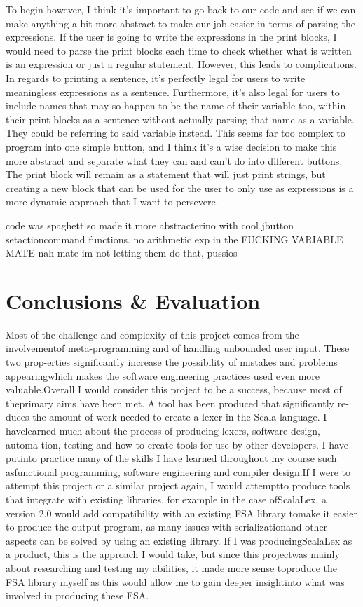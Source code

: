 \documentclass[a4paper, 12pt]{article}
\begin{document}
            To begin however, I think it's important to go back to our code and see if we can make anything
            a bit more abstract to make our job easier in terms of parsing the expressions. If the user is
            going to write the expressions in the print blocks, I would need to parse the print blocks each
            time to check whether what is written is an expression or just a regular statement. However,
            this leads to complications. In regards to printing a sentence, it's perfectly legal for
            users to write meaningless expressions as a sentence. Furthermore, it's also legal for users
            to include names that may so happen to be the name of their variable too, within their print
            blocks as a sentence without actually parsing that name as a variable. They could be referring
            to said variable instead. This seems far too complex to program into one simple button, and
            I think it's a wise decision to make this more abstract and separate what they can and can't do
            into different buttons. The print block will remain as a statement that will just print strings,
            but creating a new block that can be used for the user to only use as expressions is a more
            dynamic approach that I want to persevere.

            code was spaghett so made it more abstracterino with cool jbutton setactioncommand functions.
            no arithmetic exp in the FUCKING VARIABLE MATE nah mate im not letting them do that, pussios


    \clearpage
    \section{Conclusions \& Evaluation}
    Most of the challenge and complexity of this project comes from the involvementof meta-programming and of handling unbounded user input. These two prop-erties significantly increase the possibility of mistakes and problems appearingwhich makes the software engineering practices used even more valuable.Overall I would consider this project to be a success, because most of theprimary aims have been met. A tool has been produced that significantly re-duces the amount of work needed to create a lexer in the Scala language. I havelearned much about the process of producing lexers, software design, automa-tion, testing and how to create tools for use by other developers. I have putinto practice many of the skills I have learned throughout my course such asfunctional programming, software engineering and compiler design.If I were to attempt this project or a similar project again, I would attemptto produce tools that integrate with existing libraries, for example in the case ofScalaLex, a version 2.0 would add compatibility with an existing FSA library tomake it easier to produce the output program, as many issues with serializationand other aspects can be solved by using an existing library. If I was producingScalaLex as a product, this is the approach I would take, but since this projectwas mainly about researching and testing my abilities, it made more sense toproduce the FSA library myself as this would allow me to gain deeper insightinto what was involved in producing these FSA.
 
\end{document}
